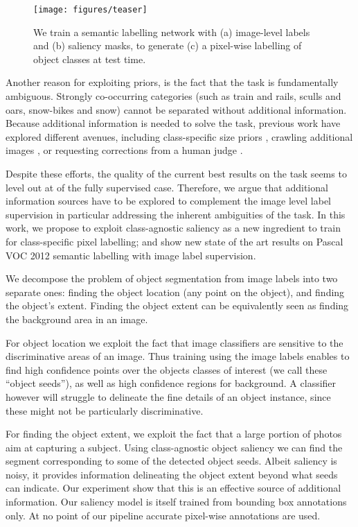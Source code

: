 \documentclass[british,10pt,twocolumn,letterpaper]{article}
\begin{document}
\begin{figure}
\begin{centering}
\texttt{[image: figures/teaser]}
\par\end{centering}
\caption{\label{fig:teaser}We train a semantic labelling network with (a)
image-level labels and (b) saliency masks, to generate (c) a pixel-wise
labelling of object classes at test time.}
\end{figure}

Another reason for exploiting priors, is the fact that the task is
fundamentally ambiguous. Strongly co-occurring categories (such as
train and rails, sculls and oars, snow-bikes and snow) cannot be separated
without additional information. Because additional information is
needed to solve the task, previous work have explored different avenues,
including class-specific size priors \cite{Pathak2015Iccv}, crawling
additional images \cite{Pinheiro2015Cvpr,Wei2015ArXiv}, or requesting
corrections from a human judge \cite{Kolesnikov2016Bmvc,Saleh2016Eccv}.

Despite these efforts, the quality of the current best results on
the task seems to level out at  of the fully
supervised case. Therefore, we argue that additional information sources
have to be explored to complement the image level label supervision
\textendash{} in particular addressing the inherent ambiguities of
the task. In this work, we propose to exploit class-agnostic saliency
as a new ingredient to train for class-specific pixel labelling; and
show new state of the art results on Pascal VOC 2012 semantic labelling
with image label supervision.

We decompose the problem of object segmentation from image labels
into two separate ones: finding the object location (any point on
the object), and finding the object's extent. Finding the object extent
can be equivalently seen as finding the background area in an image. 

For object location we exploit the fact that image classifiers are
sensitive to the discriminative areas of an image. Thus training using
the image labels enables to find high confidence points over the objects
classes of interest (we call these ``object seeds''), as well as
high confidence regions for background. A classifier however will
struggle to delineate the fine details of an object instance, since
these might not be particularly discriminative.

For finding the object extent, we exploit the fact that a large portion
of photos aim at capturing a subject. Using class-agnostic object
saliency we can find the segment corresponding to some of the detected
object seeds. Albeit saliency is noisy, it provides information delineating
the object extent beyond what seeds can indicate. Our experiment show
that this is an effective source of additional information. Our saliency
model is itself trained from bounding box annotations only. At no
point of our pipeline accurate pixel-wise annotations are used.
\end{document}
